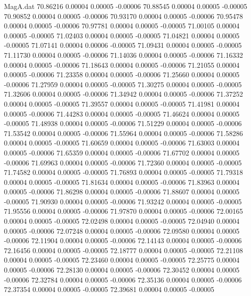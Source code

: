 \begin{filecontents}{MagA.dat}
  70.86216    0.00004    0.00005   -0.00006
  70.88545    0.00004    0.00005   -0.00005
  70.90852    0.00004    0.00005   -0.00006
  70.93170    0.00004    0.00005   -0.00006
  70.95478    0.00004    0.00005   -0.00006
  70.97781    0.00004    0.00005   -0.00005
  71.00105    0.00004    0.00005   -0.00005
  71.02403    0.00004    0.00005   -0.00005
  71.04821    0.00004    0.00005   -0.00005
  71.07141    0.00004    0.00006   -0.00005
  71.09431    0.00004    0.00005   -0.00005
  71.11730    0.00004    0.00005   -0.00006
  71.14036    0.00004    0.00005   -0.00006
  71.16332    0.00004    0.00005   -0.00006
  71.18643    0.00004    0.00005   -0.00006
  71.21055    0.00004    0.00005   -0.00006
  71.23358    0.00004    0.00005   -0.00006
  71.25660    0.00004    0.00005   -0.00006
  71.27959    0.00004    0.00005   -0.00005
  71.30275    0.00004    0.00005   -0.00005
  71.32606    0.00004    0.00005   -0.00006
  71.34942    0.00004    0.00005   -0.00006
  71.37252    0.00004    0.00005   -0.00005
  71.39557    0.00004    0.00005   -0.00005
  71.41981    0.00004    0.00005   -0.00006
  71.44283    0.00004    0.00005   -0.00005
  71.46624    0.00004    0.00005   -0.00005
  71.48938    0.00004    0.00005   -0.00006
  71.51229    0.00004    0.00005   -0.00006
  71.53542    0.00004    0.00005   -0.00006
  71.55964    0.00004    0.00005   -0.00006
  71.58286    0.00004    0.00005   -0.00005
  71.60659    0.00004    0.00005   -0.00006
  71.63003    0.00004    0.00005   -0.00006
  71.65359    0.00004    0.00005   -0.00006
  71.67702    0.00004    0.00005   -0.00006
  71.69963    0.00004    0.00005   -0.00006
  71.72360    0.00004    0.00005   -0.00005
  71.74582    0.00004    0.00005   -0.00005
  71.76893    0.00004    0.00005   -0.00005
  71.79318    0.00004    0.00005   -0.00005
  71.81634    0.00004    0.00005   -0.00006
  71.83963    0.00004    0.00005   -0.00006
  71.86298    0.00004    0.00005   -0.00006
  71.88607    0.00004    0.00005   -0.00005
  71.90930    0.00004    0.00005   -0.00006
  71.93242    0.00004    0.00005   -0.00005
  71.95556    0.00004    0.00005   -0.00006
  71.97870    0.00004    0.00005   -0.00006
  72.00165    0.00004    0.00005   -0.00005
  72.02498    0.00004    0.00005   -0.00005
  72.04940    0.00004    0.00005   -0.00006
  72.07248    0.00004    0.00005   -0.00006
  72.09580    0.00004    0.00005   -0.00006
  72.11904    0.00004    0.00005   -0.00006
  72.14143    0.00004    0.00005   -0.00006
  72.16456    0.00004    0.00005   -0.00005
  72.18777    0.00004    0.00005   -0.00005
  72.21108    0.00004    0.00005   -0.00005
  72.23460    0.00004    0.00005   -0.00005
  72.25775    0.00004    0.00005   -0.00006
  72.28130    0.00004    0.00005   -0.00006
  72.30452    0.00004    0.00005   -0.00006
  72.32784    0.00004    0.00005   -0.00006
  72.35136    0.00004    0.00005   -0.00006
  72.37354    0.00004    0.00005   -0.00005
  72.39681    0.00004    0.00005   -0.00005
\end{filecontents}
